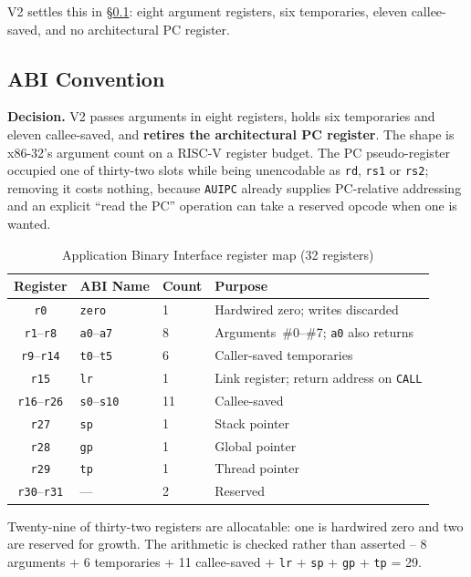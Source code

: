 \documentclass[11pt,a4paper]{article}
\begin{document}
V2 settles this in \S\ref{sec:abi}: eight argument registers, six temporaries,
eleven callee-saved, and no architectural PC register.

\subsection{ABI Convention}
\label{sec:abi}

\textbf{Decision.} V2 passes arguments in eight registers, holds six
temporaries and eleven callee-saved, and \textbf{retires the architectural PC
register}. The shape is x86-32's argument count on a RISC-V register budget.
The PC pseudo-register occupied one of thirty-two slots while being
unencodable as {\tt rd}, {\tt rs1} or {\tt rs2}; removing it costs nothing,
because {\tt AUIPC} already supplies PC-relative addressing and an explicit
``read the PC'' operation can take a reserved opcode when one is wanted.

\begin{table}[htbp]
\centering
\caption{Application Binary Interface register map (32 registers)}
\begin{tabular}{cllp{5.4cm}}
\toprule
Register & ABI Name & Count & Purpose \\
\midrule
{\tt r0}       & {\tt zero} & 1  & Hardwired zero; writes discarded \\
{\tt r1}--{\tt r8}   & {\tt a0}--{\tt a7} & 8  & Arguments~\#0--\#7; {\tt a0} also returns \\
{\tt r9}--{\tt r14}  & {\tt t0}--{\tt t5} & 6  & Caller-saved temporaries \\
{\tt r15}      & {\tt lr}  & 1  & Link register; return address on {\tt CALL} \\
{\tt r16}--{\tt r26} & {\tt s0}--{\tt s10} & 11 & Callee-saved \\
{\tt r27}      & {\tt sp}  & 1  & Stack pointer \\
{\tt r28}      & {\tt gp}  & 1  & Global pointer \\
{\tt r29}      & {\tt tp}  & 1  & Thread pointer \\
{\tt r30}--{\tt r31} & ---   & 2  & Reserved \\
\bottomrule
\end{tabular}
\end{table}

Twenty-nine of thirty-two registers are allocatable: one is hardwired zero and
two are reserved for growth. The arithmetic is checked rather than asserted --
8 arguments + 6 temporaries + 11 callee-saved + \texttt{lr} + \texttt{sp} +
\texttt{gp} + \texttt{tp} = 29.
\end{document}

